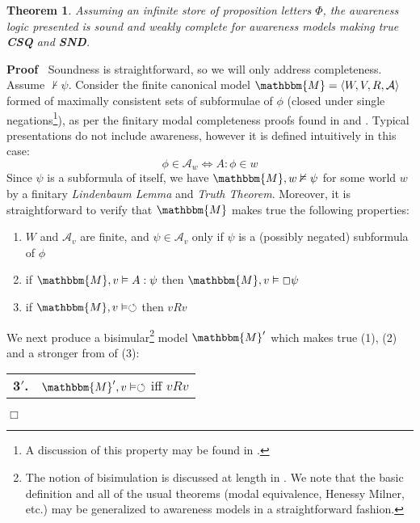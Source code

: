 \documentclass{article}
\newcommand{\tmem}[1]{{\em #1\/}}
\newcommand{\tmtextbf}[1]{{\bfseries{#1}}}
\newenvironment{enumeratenumeric}{\begin{enumerate}[1.] }{\end{enumerate}}
\newenvironment{proof}{\noindent\textbf{Proof\ }}{\hspace*{\fill}$\Box$\medskip}
\newtheorem{theorem}{Theorem}
\begin{document}
\begin{theorem}
  \label{completeness1}Assuming an infinite store of proposition letters
  $\Phi$, the awareness logic presented is sound and weakly complete for
  awareness models making true \tmtextbf{CSQ} and \tmtextbf{SND}.
\end{theorem}

\begin{proof}
  Soundness is straightforward, so we will only address completeness.  Assume
  $\nvdash \psi$.  Consider the finite canonical model $\mathbbm{M}= \langle
  W, V, R, \mathcal{A} \rangle$ formed of maximally consistent sets of
  subformulae of $\phi$ (closed under single negations{\footnote{A discussion
  of this property may be found in {\cite[pg.
  243]{blackburn_modal_2001}}.}}), as per the finitary modal completeness
  proofs found in {\cite[chapter 4.8]{blackburn_modal_2001}} and
  {\cite[chapter 5]{boolos_logic_1995}}.  Typical presentations do not
  include awareness, however it is defined intuitively in this case:
  \[ \phi \in \mathcal{A}_w \Longleftrightarrow A : \phi \in w \]
  Since $\psi$ is a subformula of itself, we have $\mathbbm{M}, w \nvDash
  \psi$ for some world $w$ by a finitary {\tmem{Lindenbaum Lemma}} and
  {\tmem{Truth Theorem}}.  Moreover, it is straightforward to verify that
  $\mathbbm{M}$ makes true the following properties:
  \begin{enumeratenumeric}
    \item $W$ and $\mathcal{A}_v$ are finite, and $\psi \in \mathcal{A}_v$
    only if $\psi$ is a (possibly negated) subformula of $\phi$
    
    \item if $\mathbbm{M}, v \vDash A : \psi$ then $\mathbbm{M}, v \vDash \Box
    \psi$
    
    \item if $\mathbbm{M}, v \vDash \circlearrowleft$ then $v R v$
  \end{enumeratenumeric}
  
  
  We next produce a bisimular{\footnote{The notion of bisimulation is
  discussed at length in {\cite[chapter 2.2]{blackburn_modal_2001}}.  We
  note that the basic definition and all of the usual theorems (modal
  equivalence, Henessy Milner, etc.) may be generalized to awareness models in
  a straightforward fashion. }} model $\mathbbm{M}'$ which makes true (1), (2)
  and a stronger from of (3):
  
  
  
  {\hspace*{\fill}}\begin{tabular}{ll}
    \tmtextbf{3$'$.} & $\mathbbm{M}', v \vDash \circlearrowleft$ iff $v R v$
  \end{tabular}{\hspace*{\fill}}
  

\end{proof}
\end{document}
